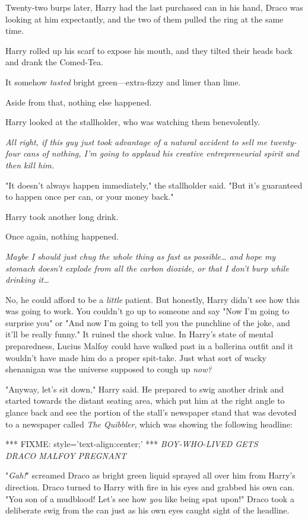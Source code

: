 Twenty-two burps later, Harry had the last purchased can in his hand, Draco was 
looking at him expectantly, and the two of them pulled the ring at the same 
time.

Harry rolled up his scarf to expose his mouth, and they tilted their heads back 
and drank the Comed-Tea.

It somehow \emph{tasted} bright green---extra-fizzy and limer than lime.

Aside from that, nothing else happened.

Harry looked at the stallholder, who was watching them benevolently.

\emph{All right, if this guy just took advantage of a natural accident to sell 
me twenty-four cans of nothing, I'm going to applaud his creative 
entrepreneurial spirit and then kill him.}

"It doesn't always happen immediately," the stallholder said. "But it's 
guaranteed to happen once per can, or your money back."

Harry took another long drink.

Once again, nothing happened.

\emph{Maybe I should just chug the whole thing as fast as possible{\ldots} and 
hope my stomach doesn't explode from all the carbon dioxide, or that I don't 
burp while drinking it{\ldots}}

No, he could afford to be a \emph{little} patient. But honestly, Harry didn't 
see how this was going to work. You couldn't go up to someone and say "Now I'm 
going to surprise you" or "And now I'm going to tell you the punchline of the 
joke, and it'll be really funny." It ruined the shock value. In Harry's state 
of mental preparedness, Lucius Malfoy could have walked past in a ballerina 
outfit and it wouldn't have made him do a proper spit-take. Just what sort of 
wacky shenanigan was the universe supposed to cough up \emph{now?}

"Anyway, let's sit down," Harry said. He prepared to swig another drink and 
started towards the distant seating area, which put him at the right angle to 
glance back and see the portion of the stall's newspaper stand that was devoted 
to a newspaper called \emph{The Quibbler}, which was showing the following 
headline:

*** FIXME: style='text-align:center;' ***
\emph{BOY-WHO-LIVED GETS\\
DRACO MALFOY PREGNANT}

"\emph{Gah!}" screamed Draco as bright green liquid sprayed all over him from 
Harry's direction. Draco turned to Harry with fire in his eyes and grabbed his 
own can. "You son of a mudblood! Let's see how \emph{you} like being spat 
upon!" Draco took a deliberate swig from the can just as his own eyes caught 
sight of the headline.

